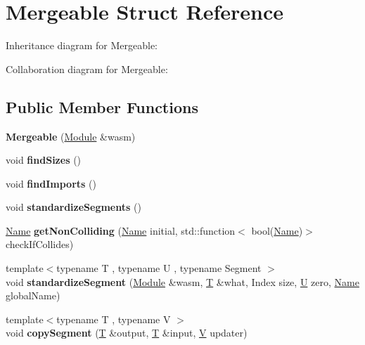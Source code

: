 \hypertarget{struct_mergeable}{}\section{Mergeable Struct Reference}
\label{struct_mergeable}


Inheritance diagram for Mergeable\+:


Collaboration diagram for Mergeable\+:
\subsection*{Public Member Functions}
\begin{DoxyCompactItemize}
\item 
\mbox{\label{struct_mergeable_a93dd8223ea551d88af9ac124c7d89a9b}} 
{\bfseries Mergeable} (\mbox{\hyperlink{classwasm_1_1_module}{Module}} \&wasm)
\item 
\mbox{\label{struct_mergeable_ac9bf6f4a19911b0176e2ea178e502ad0}} 
void {\bfseries find\+Sizes} ()
\item 
\mbox{\label{struct_mergeable_a9f6a1aefe038d485c9c8e52af411ea0f}} 
void {\bfseries find\+Imports} ()
\item 
\mbox{\label{struct_mergeable_aec5901ac708793e05ae967de87328e46}} 
void {\bfseries standardize\+Segments} ()
\item 
\mbox{\label{struct_mergeable_a920742152438f17006b4ca05258297c1}} 
\mbox{\hyperlink{structwasm_1_1_name}{Name}} {\bfseries get\+Non\+Colliding} (\mbox{\hyperlink{structwasm_1_1_name}{Name}} initial, std\+::function$<$ bool(\mbox{\hyperlink{structwasm_1_1_name}{Name}})$>$ check\+If\+Collides)
\item 
\mbox{\label{struct_mergeable_a8657651fa683a6d075909c0bb9e89aaf}} 
{\footnotesize template$<$typename T , typename U , typename Segment $>$ }\\void {\bfseries standardize\+Segment} (\mbox{\hyperlink{classwasm_1_1_module}{Module}} \&wasm, \mbox{\hyperlink{struct_t}{T}} \&what, Index size, \mbox{\hyperlink{union_u}{U}} zero, \mbox{\hyperlink{structwasm_1_1_name}{Name}} global\+Name)
\item 
\mbox{\label{struct_mergeable_a13285620333569a0fb2b450d544abfa5}} 
{\footnotesize template$<$typename T , typename V $>$ }\\void {\bfseries copy\+Segment} (\mbox{\hyperlink{struct_t}{T}} \&output, \mbox{\hyperlink{struct_t}{T}} \&input, \mbox{\hyperlink{struct_v}{V}} updater)
\end{DoxyCompactItemize}
